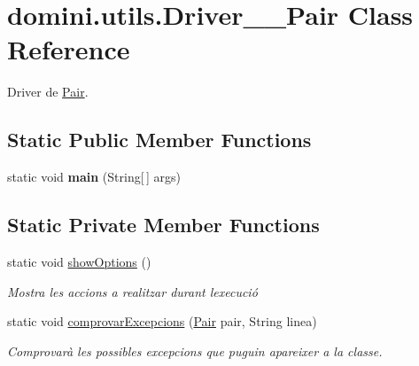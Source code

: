 \hypertarget{classdomini_1_1utils_1_1Driver____Pair}{}\section{domini.\+utils.\+Driver\+\_\+\+\_\+\+Pair Class Reference}
\label{classdomini_1_1utils_1_1Driver____Pair}


Driver de \hyperlink{classdomini_1_1utils_1_1Pair}{Pair}.  


\subsection*{Static Public Member Functions}
\begin{DoxyCompactItemize}
\item 
\mbox{\label{classdomini_1_1utils_1_1Driver____Pair_a6f6dda90b506c692dd03c4fc174550b7}} 
static void {\bfseries main} (String\mbox{[}$\,$\mbox{]} args)
\end{DoxyCompactItemize}
\subsection*{Static Private Member Functions}
\begin{DoxyCompactItemize}
\item 
\mbox{\label{classdomini_1_1utils_1_1Driver____Pair_a97596378f21ba4ab9c0c4ccb4041425b}} 
static void \hyperlink{classdomini_1_1utils_1_1Driver____Pair_a97596378f21ba4ab9c0c4ccb4041425b}{show\+Options} ()
\begin{DoxyCompactList}\small\item\em Mostra les accions a realitzar durant l\textquotesingle{}execució \end{DoxyCompactList}\item 
static void \hyperlink{classdomini_1_1utils_1_1Driver____Pair_a21b1c7ef4260412672ce94eb68b34d50}{comprovar\+Excepcions} (\hyperlink{classdomini_1_1utils_1_1Pair}{Pair} pair, String linea)
\begin{DoxyCompactList}\small\item\em Comprovarà les possibles excepcions que puguin apareixer a la classe. \end{DoxyCompactList}\end{DoxyCompactItemize}



